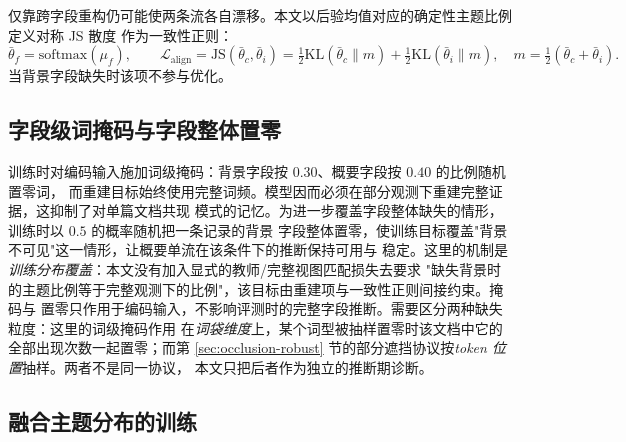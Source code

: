 \documentclass[11pt]{ctexart}
\begin{document}
仅靠跨字段重构仍可能使两条流各自漂移。本文以后验均值对应的确定性主题比例定义对称 JS 散度
作为一致性正则：
\begin{equation}
\bar\theta_f=\mathrm{softmax}(\mu_f),\qquad
\mathcal{L}_{\mathrm{align}}
=\mathrm{JS}(\bar\theta_c,\bar\theta_i)
=\tfrac12\mathrm{KL}(\bar\theta_c\parallel m)+\tfrac12\mathrm{KL}(\bar\theta_i\parallel m),
\quad m=\tfrac12(\bar\theta_c+\bar\theta_i).
\end{equation}
当背景字段缺失时该项不参与优化。

\subsection{字段级词掩码与字段整体置零}

训练时对编码输入施加词级掩码：背景字段按 $0.30$、概要字段按 $0.40$ 的比例随机置零词，
而重建目标始终使用完整词频。模型因而必须在部分观测下重建完整证据，这抑制了对单篇文档共现
模式的记忆。为进一步覆盖字段整体缺失的情形，训练时以 $0.5$ 的概率随机把一条记录的背景
字段整体置零，使训练目标覆盖"背景不可见"这一情形，让概要单流在该条件下的推断保持可用与
稳定。这里的机制是\emph{训练分布覆盖}：本文没有加入显式的教师/完整视图匹配损失去要求
"缺失背景时的主题比例等于完整观测下的比例"，该目标由重建项与一致性正则间接约束。掩码与
置零只作用于编码输入，不影响评测时的完整字段推断。需要区分两种缺失粒度：这里的词级掩码作用
在\emph{词袋维度}上，某个词型被抽样置零时该文档中它的全部出现次数一起置零；而第
\ref{sec:occlusion-robust} 节的部分遮挡协议按\emph{token 位置}抽样。两者不是同一协议，
本文只把后者作为独立的推断期诊断。

\subsection{融合主题分布的训练}
\end{document}

